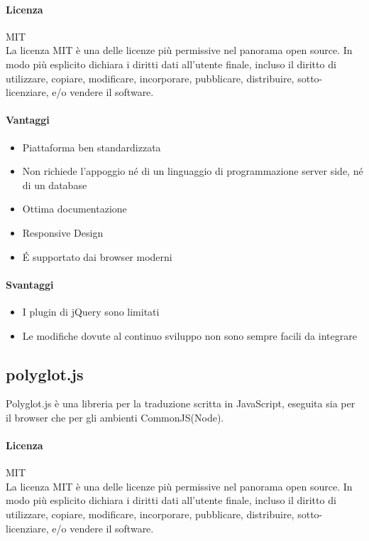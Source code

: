 \paragraph{Licenza} MIT \\
La licenza MIT è una delle licenze più permissive nel panorama open
source. In modo più esplicito dichiara i diritti dati all'utente
finale, incluso il diritto di utilizzare, copiare, modificare,
incorporare, pubblicare, distribuire, sotto-licenziare, e/o vendere il
software. 

\paragraph{Vantaggi}
\begin{itemize}
	
	\item Piattaforma ben standardizzata 
	\item Non richiede l’appoggio né di un linguaggio di programmazione server side, né di un database
	\item Ottima documentazione
	\item Responsive Design	
	\item \'E supportato dai browser moderni
	
\end{itemize}

\paragraph{Svantaggi} 
\begin{itemize}
	\item I plugin di jQuery sono limitati
	\item Le modifiche dovute al continuo sviluppo non sono sempre facili da integrare
\end{itemize}



\subsection{polyglot.js}
Polyglot.js è una libreria per la traduzione scritta in JavaScript, eseguita sia per il browser che per gli ambienti CommonJS(Node).

\paragraph{Licenza} MIT \\
La licenza MIT è una delle licenze più permissive nel panorama open
source. In modo più esplicito dichiara i diritti dati all'utente
finale, incluso il diritto di utilizzare, copiare, modificare,
incorporare, pubblicare, distribuire, sotto-licenziare, e/o vendere il
software. \\

